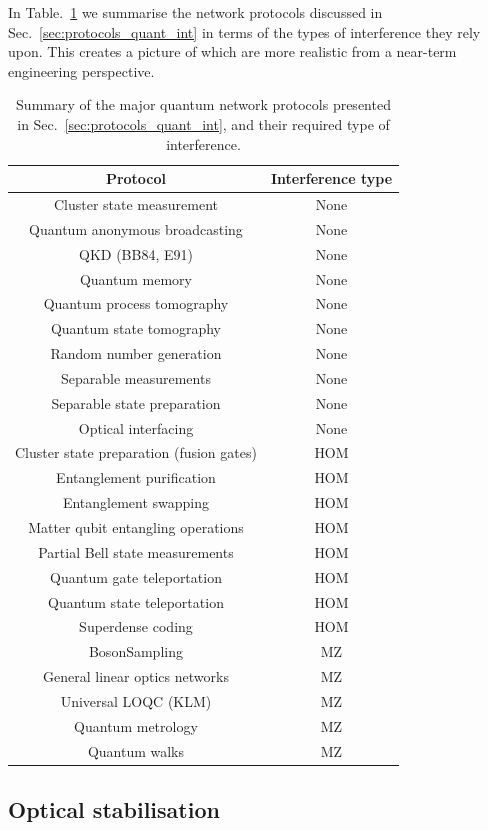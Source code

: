 In Table.~\ref{table:summary_inter} we summarise the network protocols discussed in Sec.~\ref{sec:protocols_quant_int} in terms of the types of interference they rely upon. This creates a picture of which are more realistic from a near-term engineering perspective.

\begin{table}[!htb]
	\begin{tabular}{|c|c|}
		\hline
  		Protocol & Interference type \\
  		\hline
  		\hline
  		Cluster state measurement & None \\
   		Quantum anonymous broadcasting & None \\
  		QKD (BB84, E91) & None \\
  		Quantum memory & None \\
  		Quantum process tomography & None \\
  		Quantum state tomography & None \\
  		Random number generation & None \\
  		Separable measurements & None \\
  		Separable state preparation & None \\
  		Optical interfacing & None \\
  		\hline
  		Cluster state preparation (fusion gates) & HOM \\
  		Entanglement purification & HOM \\
  		Entanglement swapping & HOM \\ 
  		Matter qubit entangling operations & HOM \\
  		Partial Bell state measurements & HOM \\
   		Quantum gate teleportation & HOM \\
  		Quantum state teleportation & HOM \\
  		Superdense coding & HOM \\
  		\hline
  		{\sc BosonSampling} & MZ \\
  		General linear optics networks & MZ \\
  		Universal LOQC (KLM) & MZ \\
  		Quantum metrology & MZ \\
  		Quantum walks & MZ \\
    	\hline
	\end{tabular}
	\caption{Summary of the major quantum network protocols presented in Sec.~\ref{sec:protocols_quant_int}, and their required type of interference.}\label{table:summary_inter}
\end{table}

%
%

\subsection{Optical stabilisation} 


